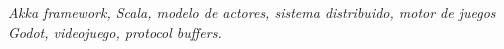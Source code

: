 \textit{
    Akka framework, Scala, modelo de actores, sistema distribuido, motor de juegos Godot,
    videojuego, protocol buffers.
}